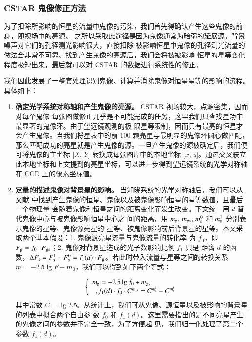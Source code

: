 \subsubsection{CSTAR 鬼像修正方法}

为了扣除所影响的恒星的流量中鬼像的污染，我们首先得确认产生这些鬼像的前身，即视场中的亮源。
之所以采取此途径是因为鬼像通常为暗弱的延展源，背景噪声对它们的孔径测光影响很大，直接扣除
被影响恒星中鬼像的孔径测光流量的做法会非常不可靠。找到产生鬼像的亮源后，我们会将被被影响
恒星的星等变化程度极短出来，最后就可以对 CSTAR 的数据进行系统性的修正。

我们因此发展了一整套处理识别鬼像、计算并消除鬼像对恒星星等的影响的流程。具体如下：

\begin{enumerate}[leftmargin=1\parindent]

\item \textbf{确定光学系统对称轴和产生鬼像的亮源。} CSTAR 视场较大，点源密集，因而对每个鬼像
每张图做修正几乎是不可能完成的任务，这里我们只查找星场中最显著的鬼像环。由于望远镜观测的极
限星等限制，因而只有最亮的恒星才会产生鬼像。当我们将星表中的前 100 颗亮星与最明显的鬼像环圆心做匹配，那么匹配成功的亮星就是产生鬼像的源。一旦产生鬼像的源被确定后，我们便可将鬼像的主坐标 [$X$, $Y$] 转换成每张图片中的本地坐标 [$x$, $y$]。通过交叉联立此本地坐标和上文提到的亮星坐标，可以进一步得到望远镜系统的光学对称轴在 CCD 上的像素坐标值。

\item \textbf{定量的描述鬼像对背景星的影响。} 当知晓系统的光学对称轴后，我们可以从文献 
 中找到产生鬼像的恒星、鬼像以及被鬼像影响恒星的星等数值，且最后一个物理量
会随着鬼像和恒星之间的距离变化而发生改变。下文统一用 $d$ 替代鬼像中心与被鬼像影响恒星中心之
间的距离，用 $m_\mathrm{g},\,m_\mathrm{gs},\,m_\mathrm{s}^0$ 和 $m_\mathrm{s}^1$ 分别表示鬼像的星等、鬼像源亮星的
星等、被鬼像影响前后背景星的星等。本文采取两个基本假设：1. 鬼像源亮星流量与鬼像流量的转化率
为 $f_0$，即 $F_{\rm{g}}=f_0\cdot F_{\rm{gs}}$；2. 鬼像对背景星造成的光子数影响比例 $f_1 $ 只是
距离 $d$ 的函数，$\Delta F_{\mathrm{s}}=F_{\mathrm{s}}^1-F_{\mathrm{s}}^0=f_1(d)\cdot F_{\mathrm{g}}$。若此时带入流量与星等之间的转换关系 $m=-2.5\lg F+m_0$，我们可以得到如下两个等式：

\begin{equation} \label{eq:ghostformular}
\left\{
\begin{array}{l}
m_{\mathrm{g}} = -2.5 \lg f_0 + m_{\mathrm{gs}} 
 \\ \ \ , 
f_1(d) \cdot f_0 \cdot C^{m_{\mathrm{gs}}} = C^{m^1_{\mathrm{s}}}-C^{m^0_{\mathrm{s}}} 
\end{array} 
\right. 
\end{equation} %
其中常数 $C=\lg 2.5$。从统计上，我们可从鬼像、源恒星以及被影响的背景星的列表中拟合两个自由参
数 $f_0$ 和 $f_1(d)$。这里需要指出的是不同亮星产生的鬼像之间的参数并不完全一致，为了方便起
见，我们归一化处理了第二个参数 $f_1(d)$。


\end{enumerate}
